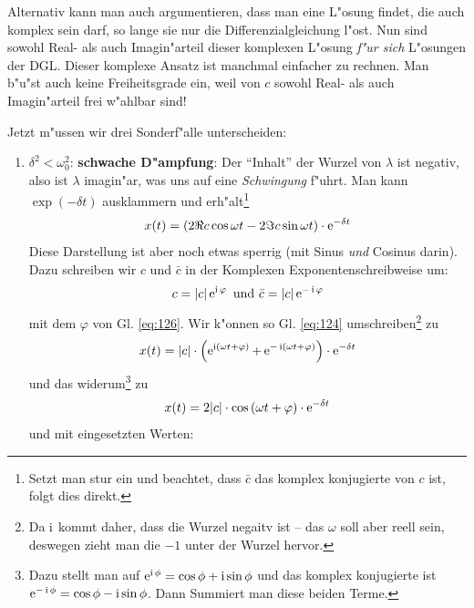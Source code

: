 Alternativ kann man auch argumentieren, dass man eine L"osung findet,
die auch komplex sein darf, so lange sie nur die Differenzialgleichung
l"ost. Nun sind sowohl Real- als auch Imagin"arteil dieser komplexen
L"osung \emph{f"ur sich} L"osungen der DGL. Dieser komplexe Ansatz ist
manchmal einfacher zu rechnen. Man b"u"st auch keine
Freiheitsgrade ein, weil von $c$ sowohl Real-
als auch Imagin"arteil frei w"ahlbar sind!

\bigskip

\noindent
Jetzt m"ussen wir drei Sonderf"alle unterscheiden:
\begin{enumerate}[F{a}ll I:]
\item $\delta^2 < \omega_0^2$: \textbf{schwache D"ampfung}: Der
   "`Inhalt"' der Wurzel von $\lambda$ ist negativ, also ist $\lambda$
   imagin"ar, was uns auf eine \emph{Schwingung} f"uhrt. Man kann
   $\exp(-\delta t)$ ausklammern und erh"alt\footnote{Setzt man stur
     ein und beachtet, dass $\bar c$ das komplex konjugierte von $c$
     ist, folgt dies direkt.}
   \begin{equation*}
      x(t) = \left(2 \Re c \cos \omega t - 2 \Im c \sin \omega
         t\right)\cdot \operatorname{e}^{-\delta t}
   \end{equation*}
   Diese Darstellung ist aber noch etwas sperrig (mit Sinus \emph{und}
   Cosinus darin). Dazu schreiben wir $c$ und $\bar c$ in der
   Komplexen Exponentenschreibweise um:
\begin{equation}
   \label{eq:20}
   c = |c| \operatorname{e}^{\operatorname{i} \varphi} \text{ und } \bar    c = |c| \operatorname{e}^{- \operatorname{i} \varphi}
\end{equation}
mit dem $\varphi$ von Gl. \eqref{eq:126}. Wir k"onnen so
Gl. \eqref{eq:124} umschreiben\footnote{Da $\operatorname{i}$ kommt daher, dass die
  Wurzel negaitv ist -- das $\omega$ soll aber reell sein, deswegen
  zieht man die $-1$ unter der Wurzel hervor.} zu
\begin{equation}
   \label{eq:2}
 x(t)  =  |c| \cdot \left( \operatorname{e}^{\operatorname{i} (\omega t + \varphi)} + \operatorname{e}^{-\operatorname{i} (\omega t +
        \varphi)}\right) \cdot \operatorname{e}^{-\delta t}
\end{equation}
und das widerum\footnote{Dazu stellt man auf $\operatorname{e}^{\operatorname{i}\phi} = \cos\phi +
  \operatorname{i}\sin\phi$ und das komplex konjugierte ist $\operatorname{e}^{-\operatorname{i}\phi} = \cos\phi
  - \operatorname{i}\sin\phi$. Dann Summiert man diese beiden Terme.} zu
\begin{equation*}
   x(t) =  2|c| \cdot \cos \left(\omega t + \varphi \right) \cdot \operatorname{e}^{-\delta t}
\end{equation*}
und mit eingesetzten Werten:
   \begin{equation}

\end{equation}
\end{enumerate}
